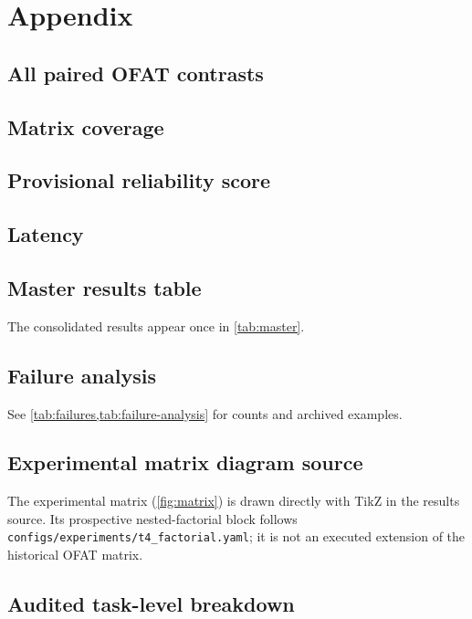 \section{Appendix}
\label{sec:appendix}

\subsection{All paired OFAT contrasts}
\label{sec:app-contrasts}



\subsection{Matrix coverage}
\label{sec:app-coverage}



\subsection{Provisional reliability score}
\label{sec:app-ers}



\subsection{Latency}
\label{sec:app-latency}



\subsection{Master results table}
\label{sec:app-master}

The consolidated results appear once in \cref{tab:master}.

\subsection{Failure analysis}
\label{sec:app-failures}

See \cref{tab:failures,tab:failure-analysis} for counts and archived examples.

\subsection{Experimental matrix diagram source}

The experimental matrix (\cref{fig:matrix}) is drawn directly with TikZ
in the results source. Its prospective nested-factorial block follows
\texttt{configs/experiments/t4\_factorial.yaml}; it is not an executed
extension of the historical OFAT matrix.

\subsection{Audited task-level breakdown}


